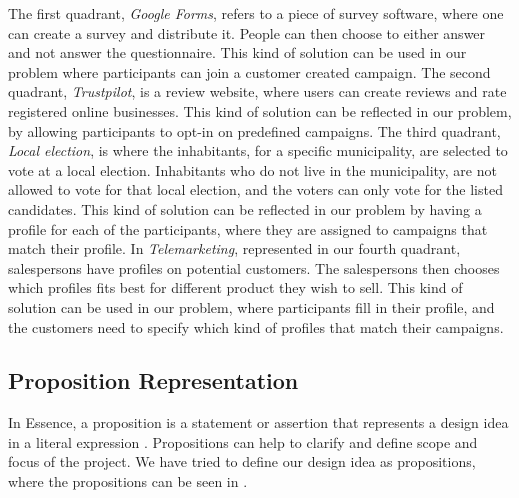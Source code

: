 The first quadrant, \emph{Google Forms}, refers to a piece of survey software, where one can create a survey and distribute it. People can then choose to either answer and not answer the questionnaire. This kind of solution can be used in our problem where participants can join a customer created campaign. The second quadrant, \emph{Trustpilot}, is a review website, where users can create reviews and rate registered online businesses. This kind of solution can be reflected in our problem, by allowing participants to opt-in on predefined campaigns. The third quadrant, \emph{Local election}, is where the inhabitants, for a specific municipality, are selected to vote at a local election. Inhabitants who do not live in the municipality, are not allowed to vote for that local election, and the voters can only vote for the listed candidates. This kind of solution can be reflected in our problem by having a profile for each of the participants, where they are assigned to campaigns that match their profile. In \emph{Telemarketing}, represented in our fourth quadrant, salespersons have profiles on potential customers. The salespersons then chooses which profiles fits best for different product they wish to sell. This kind of solution can be used in our problem, where participants fill in their profile, and the customers need to specify which kind of profiles that match their campaigns.

\subsection{Proposition Representation}
\label{sub:proposition_representation}

In Essence, a proposition is a statement or assertion that represents a design idea in a literal expression \parencite{essence_book}. Propositions can help to clarify and define scope and focus of the project. We have tried to define our design idea as propositions, where the propositions can be seen in .


